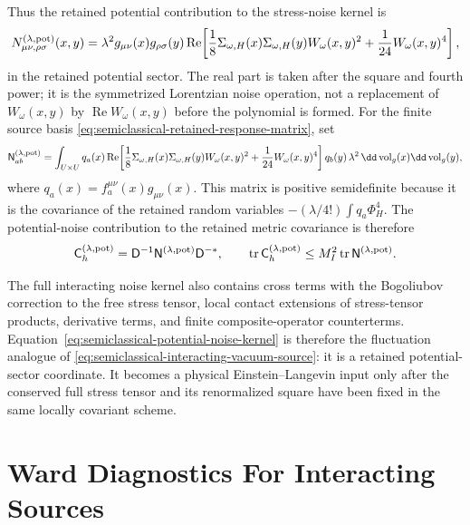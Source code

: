 \begin{controlledapproximation}
Thus the retained potential contribution to the stress-noise kernel is
\begin{equation}
  N_{\mu\nu,\rho\sigma}^{(\lambda,{\rm pot})}(x,y)
  =
  \lambda^2 g_{\mu\nu}(x)g_{\rho\sigma}(y)
  \operatorname{Re}\!\left[
    \frac18\Sigma_{\omega,H}(x)\Sigma_{\omega,H}(y)
    W_\omega(x,y)^2
    +
    \frac1{24}W_\omega(x,y)^4
  \right],
  \label{eq:semiclassical-potential-noise-kernel}
\end{equation}
in the retained potential sector.  The real part is taken after the square and
fourth power; it is the symmetrized Lorentzian noise operation, not a
replacement of \(W_\omega(x,y)\) by \(\operatorname{Re}W_\omega(x,y)\) before
the polynomial is formed.  For the finite source basis
\eqref{eq:semiclassical-retained-response-matrix}, set
\[
  \mathsf N_{ab}^{(\lambda,{\rm pot})}
  =
  \int_{U\times U}
  q_a(x)
  \operatorname{Re}\!\left[
    \frac18\Sigma_{\omega,H}(x)\Sigma_{\omega,H}(y)
    W_\omega(x,y)^2
    +
    \frac1{24}W_\omega(x,y)^4
  \right]
  q_b(y)\,
  \lambda^2\,
  \dd\operatorname{vol}_g(x)\dd\operatorname{vol}_g(y),
\]
where \(q_a(x)=f_a^{\mu\nu}(x)g_{\mu\nu}(x)\).  This matrix is positive
semidefinite because it is the covariance of the retained random variables
\(-(\lambda/4!)\int q_a\Phi_H^4\).  The potential-noise contribution to the
retained metric covariance is therefore
\begin{equation}
  \mathsf C_h^{(\lambda,{\rm pot})}
  =
  \mathsf D^{-1}\mathsf N^{(\lambda,{\rm pot})}\mathsf D^{-*},
  \qquad
  \operatorname{tr}\mathsf C_h^{(\lambda,{\rm pot})}
  \le
  M_I^2\operatorname{tr}\mathsf N^{(\lambda,{\rm pot})}.
  \label{eq:semiclassical-potential-noise-response-bound}
\end{equation}

The full interacting noise kernel also contains cross terms with the
Bogoliubov correction to the free stress tensor, local contact extensions of
stress-tensor products, derivative terms, and finite composite-operator
counterterms.  Equation~\eqref{eq:semiclassical-potential-noise-kernel} is
therefore the fluctuation analogue of
\eqref{eq:semiclassical-interacting-vacuum-source}: it is a retained
potential-sector coordinate.  It becomes a physical Einstein--Langevin input
only after the conserved full stress tensor and its renormalized square have
been fixed in the same locally covariant scheme.
\end{controlledapproximation}

\section{Ward Diagnostics For Interacting Sources}
\label{sec:semiclassical-interacting-source-ward-diagnostics}

